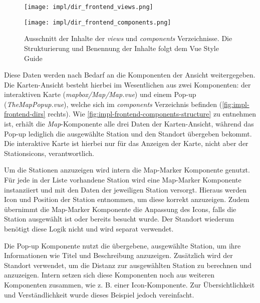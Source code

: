 \begin{figure}[htpb]
    \centering
    \begin{minipage}{.5\textwidth}
        \centering
        \texttt{[image: impl/dir\_frontend\_views.png]}
    \end{minipage}%
    \begin{minipage}{.5\textwidth}
        \centering
        \texttt{[image: impl/dir\_frontend\_components.png]}
    \end{minipage}
    \caption{Ausschnitt der Inhalte der \textit{views} und \textit{components}
    Verzeichnisse. Die Strukturierung und Benennung der Inhalte folgt dem Vue
    Style Guide \cite{You2022b}}
    \label{fig:impl-frontend-dirs}
\end{figure}

Diese Daten werden nach Bedarf an die Komponenten der Ansicht weitergegeben. Die
Karten-Ansicht besteht hierbei im Wesentlichen aus zwei Komponenten: der
interaktiven Karte (\textit{mapbox/Map/Map.vue}) und einem Pop-up
(\textit{TheMapPopup.vue}), welche sich im \textit{components} Verzeichnis
befinden (\autoref{fig:impl-frontend-dirs} rechts). Wie
\autoref{fig:impl-frontend-components-structure} zu entnehmen ist, erhält die
\textit{Map}-Komponente alle drei Daten der Karten-Ansicht, während das Pop-up
lediglich die ausgewählte Station und den Standort übergeben bekommt. Die
interaktive Karte ist hierbei nur für das Anzeigen der Karte, nicht aber der
Stationsicons, verantwortlich.

Um die Stationen anzuzeigen wird intern die Map-Marker Komponente genutzt. Für
jede in der Liste vorhandene Station wird eine Map-Marker Komponente
instanziiert und mit den Daten der jeweiligen Station versorgt. Hieraus werden
Icon und Position der Station entnommen, um diese korrekt anzuzeigen. Zudem
übernimmt die Map-Marker Komponente die Anpassung des Icons, falls die Station
ausgewählt ist oder bereits besucht wurde. Der Standort wiederum benötigt diese
Logik nicht und wird separat verwendet.

Die Pop-up Komponente nutzt die übergebene, ausgewählte Station, um ihre
Informationen wie Titel und Beschreibung anzuzeigen. Zusätzlich wird der
Standort verwendet, um die Distanz zur ausgewählten Station zu berechnen und
anzuzeigen. Intern setzen sich diese Komponenten noch aus weiteren Komponenten
zusammen, wie z. B. einer Icon-Komponente. Zur Übersichtlichkeit und
Verständlichkeit wurde dieses Beispiel jedoch vereinfacht.

